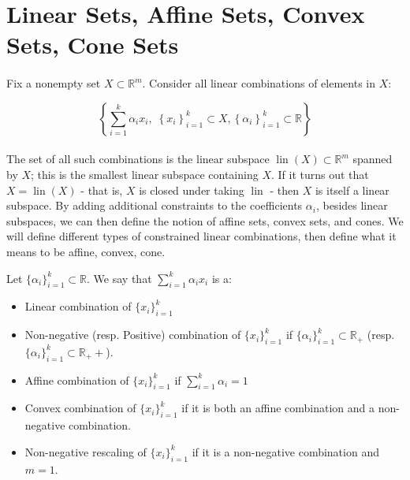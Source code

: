 \section{Linear Sets, Affine Sets, Convex Sets, Cone Sets}
\label{sect:011}

\paragraph{}Fix a nonempty set $X\subset \mathbb{R}^m$. Consider all linear combinations of elements in $X$:

\[
	\left\{\sum_{i=1}^k \alpha_i x_i,\; \left\{ x_i \right\}_{i=1}^k \subset X, \left\{\alpha_i\right\}_{i=1}^k\subset \mathbb{R}\right\}
\]

\paragraph{}The set of all such combinations is the linear subspace $\operatorname{lin}(X)\subset \mathbb{R}^m$ spanned by $X$; this is the smallest linear subspace containing $X$. If it turns out that $X=\operatorname{lin}(X)$ - that is, $X$ is closed under taking $\operatorname{lin}$ - then $X$ is itself a linear subspace. By adding additional constraints to the coefficients $\alpha_i$, besides linear subspaces, we can then define the notion of affine sets, convex sets, and cones. We will define different types of constrained linear combinations, then define what it means to be affine, convex, cone.

\begin{defn}[Combinations]\label{defn:011-comb}
	Let $\{\alpha_i\}_{i=1}^k\subset \mathbb{R}$. We say that $\sum_{i=1}^k \alpha_i x_i$ is a:
	\begin{itemize}
		\item Linear combination of $\{ x_i \}_{i=1}^k$
		\item Non-negative (resp. Positive) combination of $\{ x_i \}_{i=1}^k$ if $\{\alpha_i\}_{i=1}^k\subset \mathbb{R}_+$ (resp. $\{\alpha_i\}_{i=1}^k\subset \mathbb{R}_++$).
		\item Affine combination of $\{ x_i \}_{i=1}^k$ if $\sum_{i=1}^k \alpha_i=1$
		\item Convex combination of $\{ x_i \}_{i=1}^k$ if it is both an affine combination and a non-negative combination.
		\item Non-negative rescaling of $\{ x_i \}_{i=1}^k$ if it is a non-negative combination and $m=1$.
	\end{itemize}
\end{defn}

